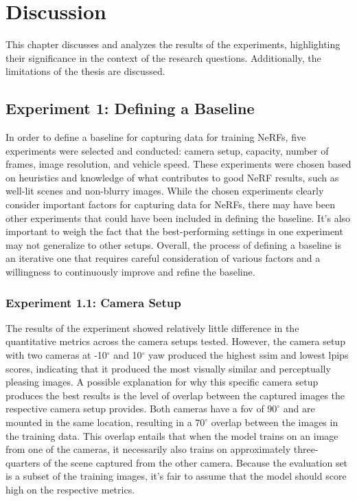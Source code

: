 \chapter{Discussion}
This chapter discusses and analyzes the results of the experiments, highlighting their significance in the context of the research questions. Additionally, the limitations of the thesis are discussed.

\section{Experiment 1: Defining a Baseline}

\begin{comment}
Points to discuss:
- Main point: Discuss the process of choosing which experiments was chosen.
- There might have been other experiments that should've been included in deciding the baseline.
- The way to choose which experiment goes forward could've been done differently.
- Although one experiment seem to do better with the current chosen setup, it might've done worse in another setup.
\end{comment}

In order to define a baseline for capturing data for training NeRFs, five experiments were selected and conducted: camera setup, capacity, number of frames, image resolution, and vehicle speed. These experiments were chosen based on heuristics and knowledge of what contributes to good NeRF results, such as well-lit scenes and non-blurry images. While the chosen experiments clearly consider important factors for capturing data for NeRFs, there may have been other experiments that could have been included in defining the baseline. It's also important to weigh the fact that the best-performing settings in one experiment may not generalize to other setups. Overall, the process of defining a baseline is an iterative one that requires careful consideration of various factors and a willingness to continuously improve and refine the baseline.

\subsection{Experiment 1.1: Camera Setup}
The results of the experiment showed relatively little difference in the quantitative metrics across the camera setups tested. However, the camera setup with two cameras at -10$^{\circ}$ and 10$^{\circ}$ yaw produced the highest \acrshort{ssim} and lowest \acrshort{lpips} scores, indicating that it produced the most visually similar and perceptually pleasing images. A possible explanation for why this specific camera setup produces the best results is the level of overlap between the captured images the respective camera setup provides. Both cameras have a \acrshort{fov} of $90^\circ$ and are mounted in the same location, resulting in a $70^\circ$ overlap between the images in the training data. This overlap entails that when the model trains on an image from one of the cameras, it necessarily also trains on approximately three-quarters of the scene captured from the other camera. Because the evaluation set is a subset of the training images, it's fair to assume that the model should score high on the respective metrics.

